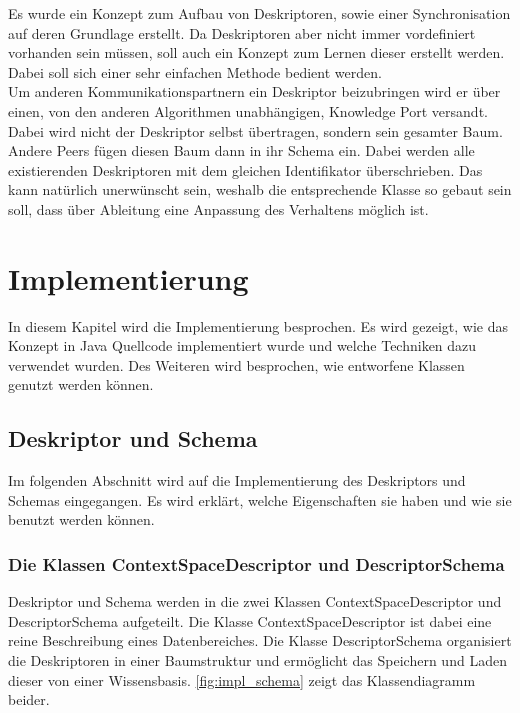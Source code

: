 \documentclass[a4paper]{article}
\begin{document}
	Es wurde ein Konzept zum Aufbau von Deskriptoren, sowie einer Synchronisation
	auf deren Grundlage erstellt. Da Deskriptoren aber nicht immer vordefiniert
	vorhanden sein müssen, soll auch ein Konzept zum Lernen dieser erstellt werden. 
	Dabei soll sich einer sehr einfachen Methode bedient werden. \\
	
	Um anderen Kommunikationspartnern ein Deskriptor beizubringen wird er über
	einen, von den anderen Algorithmen unabhängigen, Knowledge Port versandt.
	Dabei wird nicht der Deskriptor selbst übertragen, sondern sein gesamter Baum.
	Andere Peers fügen diesen Baum dann in ihr Schema ein. Dabei werden alle
	existierenden Deskriptoren mit dem gleichen Identifikator überschrieben. 
	Das kann natürlich unerwünscht sein, weshalb die entsprechende Klasse
	so gebaut sein soll, dass über Ableitung eine Anpassung des Verhaltens
	möglich ist.
	
	\newpage
	\section{Implementierung}
	
	In diesem Kapitel wird die Implementierung besprochen. Es wird gezeigt, wie
	das Konzept in Java Quellcode implementiert wurde und welche Techniken dazu
	verwendet wurden. Des Weiteren wird besprochen, wie entworfene Klassen 
	genutzt werden können.
	
	\subsection{Deskriptor und Schema}
	
	Im folgenden Abschnitt wird auf die Implementierung des Deskriptors und Schemas
	eingegangen. Es wird erklärt, welche Eigenschaften sie haben und wie sie benutzt
	werden können.
	
	\subsubsection{Die Klassen ContextSpaceDescriptor und DescriptorSchema}
	
	Deskriptor und Schema werden in die zwei Klassen ContextSpaceDescriptor
	und DescriptorSchema aufgeteilt. Die Klasse ContextSpaceDescriptor ist dabei
	eine reine Beschreibung eines Datenbereiches. Die Klasse DescriptorSchema
	organisiert die Deskriptoren in einer Baumstruktur und ermöglicht das
	Speichern und Laden dieser von einer Wissensbasis. \autoref{fig:impl_schema}
	zeigt das Klassendiagramm beider.
	
\end{document}
